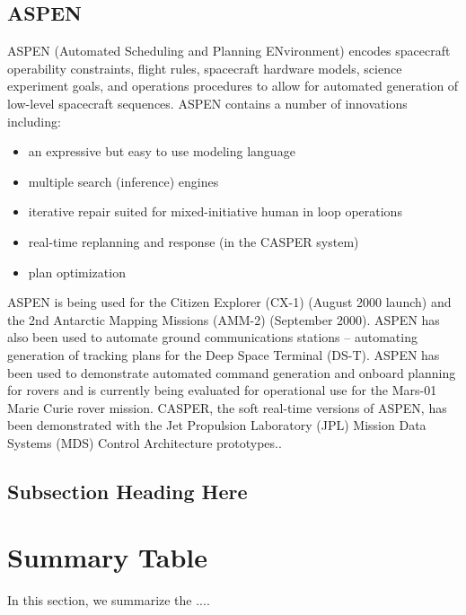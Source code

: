 \documentclass[conference]{IEEEtran}
\begin{document}
\subsection{ASPEN}\label{sec:aspen}
ASPEN (Automated Scheduling and Planning ENvironment) encodes spacecraft operability constraints, flight rules, spacecraft hardware models, science experiment goals, and operations procedures to allow for automated generation of low-level spacecraft sequences. ASPEN contains a number of innovations including: 

\begin{itemize}
  \item an expressive but easy to use modeling language
  \item multiple search (inference) engines
  \item iterative repair suited for mixed-initiative human in loop operations
  \item real-time replanning and response (in the CASPER system)
  \item plan optimization
\end{itemize}
 
 ASPEN is being used for the Citizen Explorer (CX-1) (August 2000 launch) and the 2nd Antarctic Mapping Missions (AMM-2) (September 2000). ASPEN has also been used to automate ground communications stations – automating generation of tracking plans for the Deep Space Terminal (DS-T). ASPEN has been used to demonstrate automated command generation and onboard planning for rovers and is currently being evaluated for operational use for the Mars-01 Marie Curie rover mission. CASPER, the soft real-time versions of ASPEN, has been demonstrated with the Jet Propulsion Laboratory (JPL) Mission Data Systems (MDS) Control Architecture prototypes..


\subsection{Subsection Heading Here}


\section{Summary Table}\label{sec:table}
In this section, we summarize the ....
\end{document}
